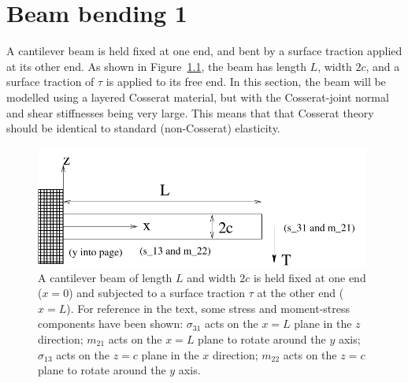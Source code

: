 \documentclass[]{scrreprt}
\begin{document}
\chapter{Beam bending 1}

A cantilever beam is held fixed at one end, and bent by a surface
traction applied at its other end.  As shown in
Figure~\ref{beam_cant.fig}, the beam has length $L$, width $2c$, and a
surface traction of $\tau$ is applied to its free end.  In this
section, the beam will be modelled using a layered Cosserat material,
but with the Cosserat-joint normal and shear stiffnesses being very
large.  This means that that Cosserat theory should be identical to
standard (non-Cosserat) elasticity.

\begin{figure}[htb]
\begin{center}
\includegraphics[width=11cm]{beam_cantilever.pdf}
\caption{A cantilever beam of length $L$ and width $2c$ is held fixed
  at one end ($x=0$) and subjected to a surface traction $\tau$ at the
  other end ($x=L$).  For reference in the text, some stress and
  moment-stress components have been shown: $\sigma_{31}$ acts on the
  $x=L$ plane in the $z$ direction; $m_{21}$ acts on the $x=L$ plane to
  rotate around the $y$ axis; $\sigma_{13}$ acts on the $z=c$ plane in
  the $x$ direction; $m_{22}$ acts on the $z=c$ plane to rotate around
  the $y$ axis.}
\label{beam_cant.fig}
\end{center}
\end{figure}
\end{document}
